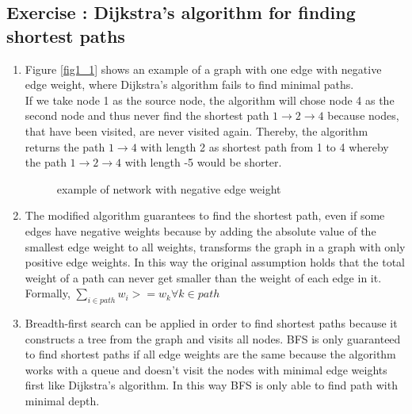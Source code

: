 \documentclass[10pt,a4paper]{article}
\newcommand{\exercise}[1]
{
  \stepcounter{subsection}
  \subsection*{Exercise \thesubsection: #1}

}
\begin{document}
\exercise{Dijkstra's algorithm for finding shortest paths}
\begin{enumerate}
\item Figure \ref{fig1_1} shows an example of a graph with one edge with negative edge weight, where Dijkstra's algorithm fails to find minimal paths.\\
If we take node 1 as the source node, the algorithm will chose node 4 as the second node and thus never find the shortest path $1 \rightarrow 2 \rightarrow 4$ because nodes, that have been visited, are never visited again. Thereby, the algorithm returns the path $1 \rightarrow 4$ with length 2 as shortest path from 1 to 4 whereby the path $1 \rightarrow 2 \rightarrow 4$ with length -5 would be shorter.
\begin{figure}
\begin{center}
\caption{example of network with negative edge weight}
\end{center}
\end{figure}

\item The modified algorithm guarantees to find the shortest path, even if some edges have negative weights because by adding the absolute value of the smallest edge weight to all weights, transforms the graph in a graph with only positive edge weights. In this way the original assumption holds that the total weight of a path can never get smaller than the weight of each edge in it. Formally, $\sum_{i \in path} w_i >= w_k \forall k \in path$

\item Breadth-first search can be applied in order to find shortest paths because it constructs a tree from the graph and visits all nodes. BFS is only guaranteed to find shortest paths if all edge weights are the same because the algorithm works with a queue and doesn't visit the nodes with minimal edge weights first like Dijkstra's algorithm. In this way BFS is only able to find path with minimal depth.
\end{enumerate}
\end{document}
